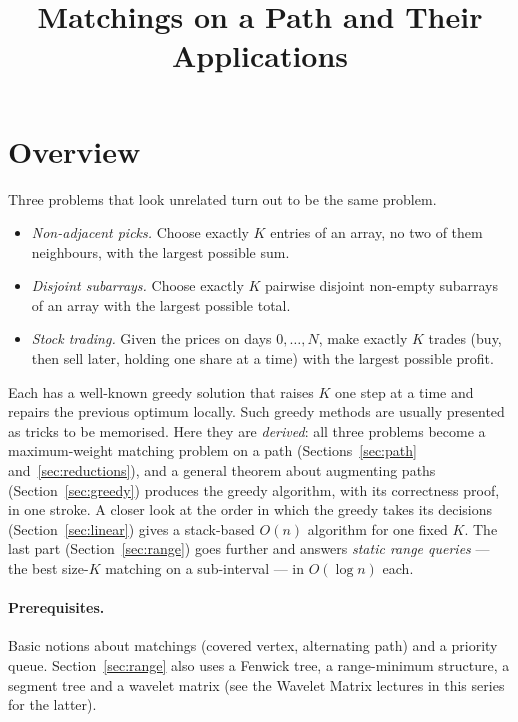 \documentclass[11pt]{article}
\title{Matchings on a Path and Their Applications}
\author{}
\date{}
\begin{document}
\thispagestyle{fancy}


\section{Overview}
Three problems that look unrelated turn out to be the same problem.

\begin{itemize}[leftmargin=1.5em,itemsep=1pt]
  \item \emph{Non-adjacent picks.} Choose exactly $K$ entries of an array,
        no two of them neighbours, with the largest possible sum.
  \item \emph{Disjoint subarrays.} Choose exactly $K$ pairwise disjoint
        non-empty subarrays of an array with the largest possible total.
  \item \emph{Stock trading.} Given the prices on days $0,\dots,N$, make
        exactly $K$ trades (buy, then sell later, holding one share at a
        time) with the largest possible profit.
\end{itemize}

Each has a well-known greedy solution that raises $K$ one step at a time
and repairs the previous optimum locally. Such greedy methods are usually
presented as tricks to be memorised. Here they are \emph{derived}: all three
problems become a maximum-weight matching problem on a path
(Sections~\ref{sec:path} and~\ref{sec:reductions}), and a general theorem
about augmenting paths (Section~\ref{sec:greedy}) produces the greedy
algorithm, with its correctness proof, in one stroke. A closer look at
the order in which the greedy takes its decisions
(Section~\ref{sec:linear}) gives a stack-based $O(n)$ algorithm for one
fixed $K$. The last part (Section~\ref{sec:range}) goes further and
answers \emph{static range queries} --- the best size-$K$ matching on a
sub-interval --- in $O(\log n)$ each.

\paragraph{Prerequisites.} Basic notions about matchings (covered vertex,
alternating path) and a priority queue. Section~\ref{sec:range} also uses
a Fenwick tree, a range-minimum structure, a segment tree and a wavelet
matrix (see the Wavelet Matrix lectures in this series for the latter).
\end{document}
